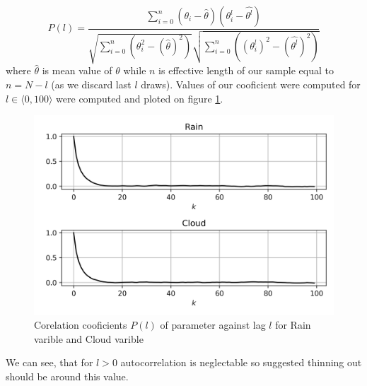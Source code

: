 \documentclass[12pt,a4paper]{article}
\begin{document}
\begin{equation*}
    P(l)=\frac{\sum_{i=0}^{n}(\theta_i-\hat{\theta})(\theta^l_i-\hat{\theta^l})}
    {\sqrt{\sum_{i=0}^n(\theta_i^2-(\hat{\theta})^2)}\sqrt{\sum_{i=0}^n((\theta_i^l)^2-(\hat{\theta^l})^2)}}
\end{equation*} where $\hat{\theta}$ is mean value of $\theta$ while $n$ is effective length of our sample equal to $n=N-l$ (as we discard last $l$ draws).
Values of our cooficient were computed for $l\in \langle 0 , 100\rangle$ were computed and ploted on figure \ref{plot_6}.
\begin{figure}[H]
    \begin{center}
    \includegraphics{plot_6.png}
    \end{center}
    \caption{Corelation cooficients $P(l)$ of parameter against lag $l$ for Rain varible and Cloud varible}\label{plot_6}
\end{figure} We can see, that for $l>0$ autocorrelation is neglectable so suggested thinning out should be around this value. 
\end{document}

